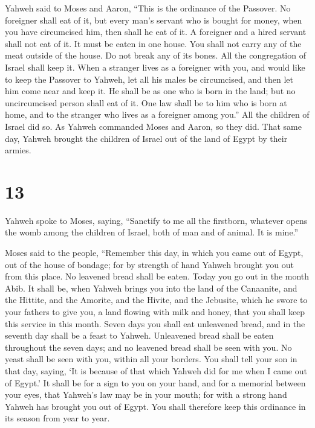  Yahweh said to Moses and Aaron, ``This is the ordinance of
the Passover. No foreigner shall eat of it,  but every
man's servant who is bought for money, when you have circumcised him,
then shall he eat of it.  A foreigner and a hired servant
shall not eat of it.  It must be eaten in one house. You
shall not carry any of the meat outside of the house. Do not break any
of its bones.  All the congregation of Israel shall keep
it.  When a stranger lives as a foreigner with you, and
would like to keep the Passover to Yahweh, let all his males be
circumcised, and then let him come near and keep it. He shall be as one
who is born in the land; but no uncircumcised person shall eat of it.
 One law shall be to him who is born at home, and to the
stranger who lives as a foreigner among you.''  All the
children of Israel did so. As Yahweh commanded Moses and Aaron, so they
did.  That same day, Yahweh brought the children of Israel
out of the land of Egypt by their armies.

\hypertarget{section-12}{%
\section{13}\label{section-12}}

 Yahweh spoke to Moses, saying,  ``Sanctify to
me all the firstborn, whatever opens the womb among the children of
Israel, both of man and of animal. It is mine.''

 Moses said to the people, ``Remember this day, in which you
came out of Egypt, out of the house of bondage; for by strength of hand
Yahweh brought you out from this place. No leavened bread shall be
eaten.  Today you go out in the month Abib.  It
shall be, when Yahweh brings you into the land of the Canaanite, and the
Hittite, and the Amorite, and the Hivite, and the Jebusite, which he
swore to your fathers to give you, a land flowing with milk and honey,
that you shall keep this service in this month.  Seven days
you shall eat unleavened bread, and in the seventh day shall be a feast
to Yahweh.  Unleavened bread shall be eaten throughout the
seven days; and no leavened bread shall be seen with you. No yeast shall
be seen with you, within all your borders.  You shall tell
your son in that day, saying, `It is because of that which Yahweh did
for me when I came out of Egypt.'  It shall be for a sign to
you on your hand, and for a memorial between your eyes, that Yahweh's
law may be in your mouth; for with a strong hand Yahweh has brought you
out of Egypt.  You shall therefore keep this ordinance in
its season from year to year.

